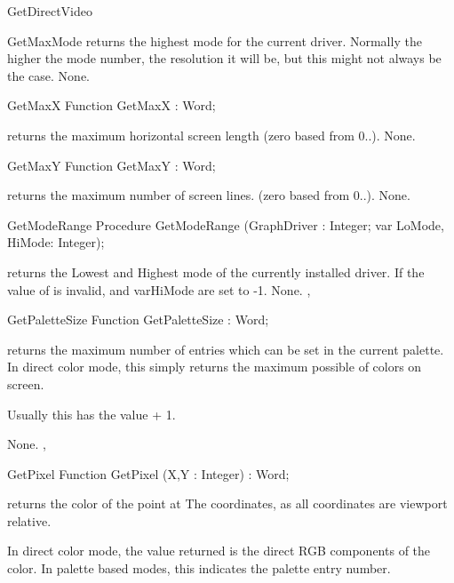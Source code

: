 \begin{function}{GetDirectVideo}
\begin{function}{GetMaxMode}
\Description
{} returns the highest mode for the current driver. Normally
the higher the mode number, the resolution it will be, but this might not
always be the case.
\Errors
None.
\SeeAlso
{}
\end{function}

\begin{function}{GetMaxX}
\Declaration
Function GetMaxX  : Word;

\Description
{} returns the maximum horizontal screen
length (zero based from 0..).
\Errors
None.
\SeeAlso
{}
\end{function}
\begin{function}{GetMaxY}
\Declaration
Function GetMaxY  : Word;

\Description
{} returns the maximum number of screen
lines. (zero based from 0..).
\Errors
None.
\SeeAlso
{}
\end{function}

\begin{procedure}{GetModeRange}
\Declaration
Procedure GetModeRange (GraphDriver : Integer; var LoMode, HiMode: Integer);

\Description
{} returns the Lowest and Highest mode of the currently
installed driver. If the value of  is invalid, 
and var{HiMode} are set to -1.
\Errors
None.
\SeeAlso
{}, 
\end{procedure}
\begin{function}{GetPaletteSize}
\Declaration
Function GetPaletteSize  : Word;

\Description
{} returns the maximum number of entries which
can be set in the current palette. In direct color mode, this simply
returns the maximum possible of colors on screen.

Usually this has the value  + 1.

\Errors
None.
\SeeAlso
{},
\end{function}
\begin{function}{GetPixel}
\Declaration
Function GetPixel (X,Y : Integer) : Word;

\Description
{} returns the color
of the point at  The coordinates, as all coordinates
are viewport relative.

In direct color mode, the value returned is the direct RGB components of
the color. In palette based modes, this indicates the palette entry number.


\end{function}
\end{function}
